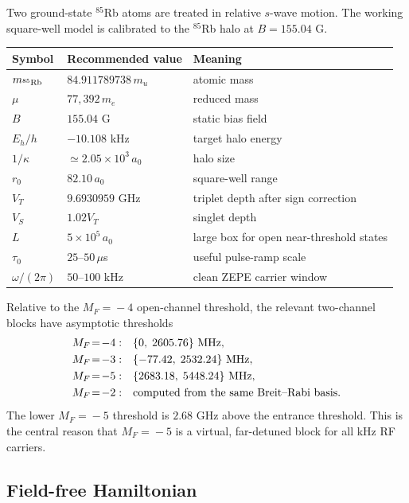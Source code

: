 \documentclass[11pt,a4paper]{article}
\newcommand{\MF}[1]{M_F\!=\!#1}
\begin{document}
Two ground-state $^{85}$Rb atoms are treated in relative $s$-wave motion.  The
working square-well model is calibrated to the $^{85}$Rb halo at $B=155.04$ G.

\begin{center}
\begin{tabular}{@{}lll@{}}
\toprule
Symbol & Recommended value & Meaning \\
\midrule
$m_{^{85}{\rm Rb}}$ & $84.911789738\,m_u$ & atomic mass \\
$\mu$ & $77{,}392\,m_e$ & reduced mass \\
$B$ & $155.04$ G & static bias field \\
$E_h/h$ & $-10.108$ kHz & target halo energy \\
$1/\kappa$ & $\simeq2.05\times10^3\,a_0$ & halo size \\
$r_0$ & $82.10\,a_0$ & square-well range \\
$V_T$ & $9.6930959$ GHz & triplet depth after sign correction \\
$V_S$ & $1.02V_T$ & singlet depth \\
$L$ & $5\times10^5\,a_0$ & large box for open near-threshold states \\
$\tau_0$ & $25$--$50\,\mu$s & useful pulse-ramp scale \\
$\omega/(2\pi)$ & $50$--$100$ kHz & clean ZEPE carrier window \\
\bottomrule
\end{tabular}
\end{center}

Relative to the $\MF{-4}$ open-channel threshold, the relevant two-channel
blocks have asymptotic thresholds
\begin{align}
\MF{-4}:&\quad \{0,\;2605.76\}\ {\rm MHz},\\
\MF{-3}:&\quad \{-77.42,\;2532.24\}\ {\rm MHz},\\
\MF{-5}:&\quad \{2683.18,\;5448.24\}\ {\rm MHz},\\
\MF{-2}:&\quad \text{computed from the same Breit--Rabi basis.}
\end{align}
The lower $\MF{-5}$ threshold is $2.68$ GHz above the entrance threshold.  This
is the central reason that $\MF{-5}$ is a virtual, far-detuned block for all kHz
RF carriers.

\subsection{Field-free Hamiltonian}
\end{document}
